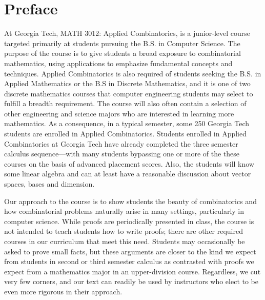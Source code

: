 
\chapter{Preface}\label{ch:preface}

At Georgia Tech, MATH 3012: Applied Combinatorics, is a junior-level
course targeted primarily at students pursuing the B.S. in
Computer Science.  The purpose of the course is to give students a
broad exposure to combinatorial mathematics, using applications to
emphasize fundamental concepts and techniques.
Applied Combinatorics is also required of students seeking the B.S. in
Applied Mathematics or the B.S in Discrete Mathematics, and it is one
of two discrete mathematics courses that computer engineering students may select to
fulfill a breadth requirement.  The course will also often contain a selection
of other engineering and science majors who are interested in learning
more mathematics.   As a consequence, in a typical semester, some 250 Georgia
Tech students are enrolled in Applied Combinatorics. Students enrolled
in Applied Combinatorics at Georgia Tech have already completed the
three semester calculus sequence---with many students bypassing
one or more of the these courses on the basis of advanced placement
scores.  Also, the students will know some linear algebra and can
at least have a reasonable discussion about vector spaces, bases and
dimension.  

Our approach to the course is to show students the beauty of
combinatorics and how combinatorial problems naturally arise in many
settings, particularly in computer science. While proofs are
periodically presented in class, the course is not intended to teach
students how to write proofs; there are other required courses in our
curriculum that meet this need. Students may occasionally be asked to
prove small facts, but these arguments are closer to the kind we
expect from students in second or third semester calculus as contrasted
with proofs we expect from a mathematics major in an upper-division course.
Regardless, we cut very few corners, and our text can readily be
used by instructors who elect to be even more rigorous in their
approach.

